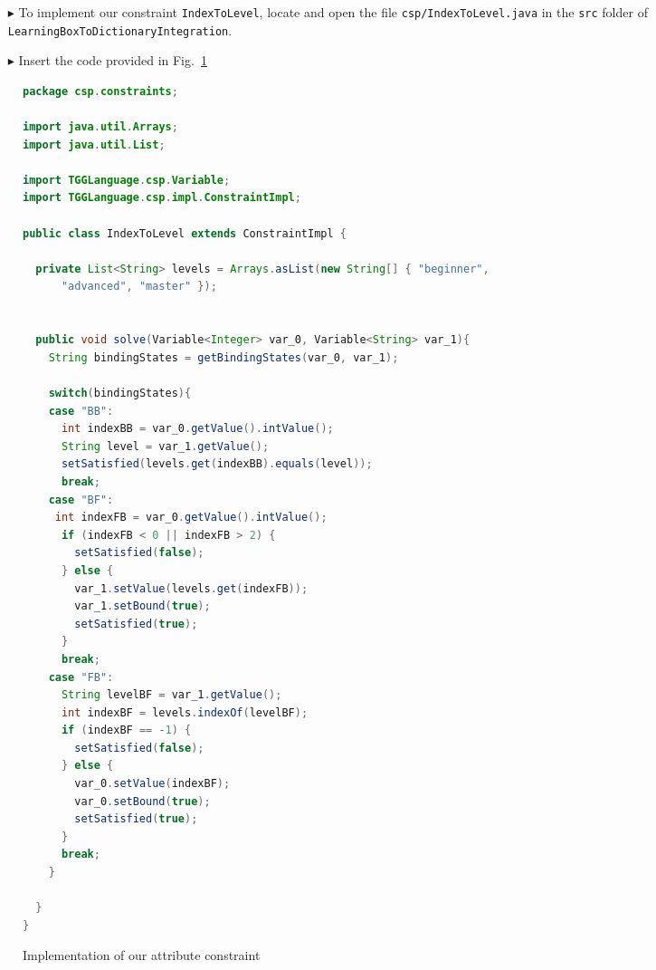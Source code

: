 \begin{enumerate}
  \item[$\blacktriangleright$] To implement our constraint \texttt{IndexToLevel}, locate and open the file \texttt{csp/IndexToLevel.java} in the \texttt{src} folder of \texttt{Learning\-Box\-To\-Dictionary\-Integration}.
  \item[$\blacktriangleright$] Insert the code provided in Fig.~\ref{fig:indexToLevel}

\end{enumerate}

\begin{figure}[htbp]
\begin{center}
\begin{lstlisting}[language=Java,backgroundcolor=\color{white}, keywordstyle={\bfseries\color{purple}}]
package csp.constraints;

import java.util.Arrays;
import java.util.List;

import TGGLanguage.csp.Variable;
import TGGLanguage.csp.impl.ConstraintImpl;

public class IndexToLevel extends ConstraintImpl {

  private List<String> levels = Arrays.asList(new String[] { "beginner",
      "advanced", "master" });


  public void solve(Variable<Integer> var_0, Variable<String> var_1){
    String bindingStates = getBindingStates(var_0, var_1);

    switch(bindingStates){
    case "BB":
      int indexBB = var_0.getValue().intValue();
      String level = var_1.getValue();
      setSatisfied(levels.get(indexBB).equals(level));
      break;
    case "BF":
     int indexFB = var_0.getValue().intValue();
      if (indexFB < 0 || indexFB > 2) {
        setSatisfied(false);
      } else {
        var_1.setValue(levels.get(indexFB));
        var_1.setBound(true);
        setSatisfied(true);
      }
      break;
    case "FB":
      String levelBF = var_1.getValue();
      int indexBF = levels.indexOf(levelBF);
      if (indexBF == -1) {
        setSatisfied(false);
      } else {
        var_0.setValue(indexBF);
        var_0.setBound(true);
        setSatisfied(true);
      }
      break;
    }

  }
}
\end{lstlisting}
  \caption{Implementation of our attribute constraint}
  \label{fig:indexToLevel}
\end{center}
\end{figure}

